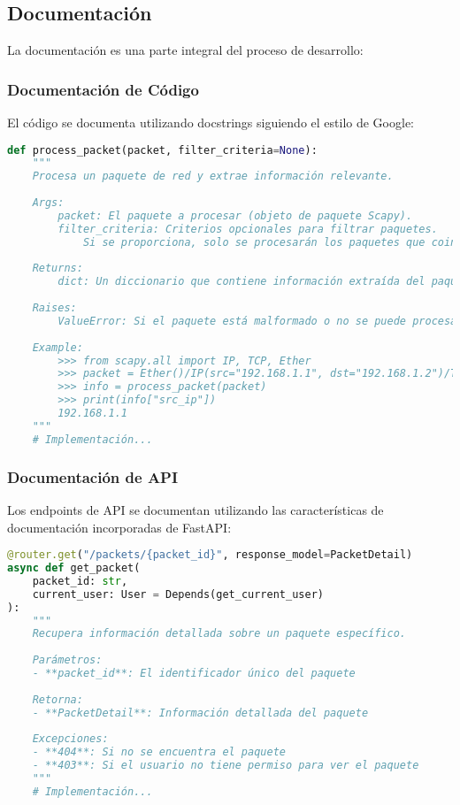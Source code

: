 \subsection{Documentación}
La documentación es una parte integral del proceso de desarrollo:

\subsubsection{Documentación de Código}
El código se documenta utilizando docstrings siguiendo el estilo de Google:

\begin{lstlisting}[language=python, caption=Ejemplo de Docstring]
def process_packet(packet, filter_criteria=None):
    """
    Procesa un paquete de red y extrae información relevante.
    
    Args:
        packet: El paquete a procesar (objeto de paquete Scapy).
        filter_criteria: Criterios opcionales para filtrar paquetes.
            Si se proporciona, solo se procesarán los paquetes que coincidan con los criterios.
            
    Returns:
        dict: Un diccionario que contiene información extraída del paquete.
        
    Raises:
        ValueError: Si el paquete está malformado o no se puede procesar.
    
    Example:
        >>> from scapy.all import IP, TCP, Ether
        >>> packet = Ether()/IP(src="192.168.1.1", dst="192.168.1.2")/TCP()
        >>> info = process_packet(packet)
        >>> print(info["src_ip"])
        192.168.1.1
    """
    # Implementación...
\end{lstlisting}

\subsubsection{Documentación de API}
Los endpoints de API se documentan utilizando las características de documentación incorporadas de FastAPI:

\begin{lstlisting}[language=python, caption=Ejemplo de Documentación de API]
@router.get("/packets/{packet_id}", response_model=PacketDetail)
async def get_packet(
    packet_id: str,
    current_user: User = Depends(get_current_user)
):
    """
    Recupera información detallada sobre un paquete específico.
    
    Parámetros:
    - **packet_id**: El identificador único del paquete
    
    Retorna:
    - **PacketDetail**: Información detallada del paquete
    
    Excepciones:
    - **404**: Si no se encuentra el paquete
    - **403**: Si el usuario no tiene permiso para ver el paquete
    """
    # Implementación...
\end{lstlisting}


